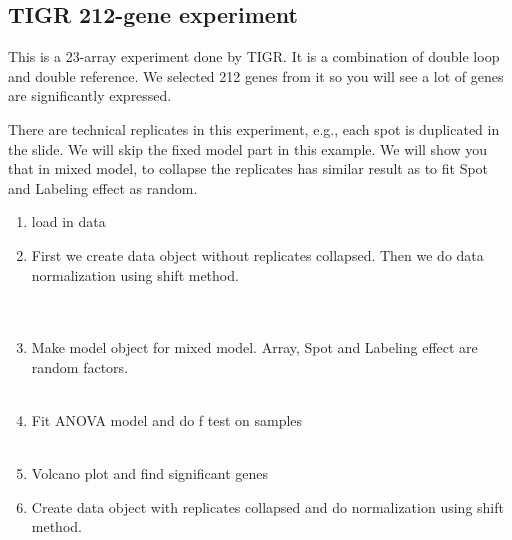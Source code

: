 \subsection{TIGR 212-gene experiment}
\hspace{14pt}This is a 23-array experiment done by TIGR. It is a combination of
double loop and double reference. We selected 212 genes from it
so you will see a lot of genes are significantly expressed. 

There are technical replicates in this experiment, e.g., each spot is duplicated
in the slide. We will skip the fixed model part in this example. We will show 
you that in mixed model, to collapse the replicates has similar result as
to fit Spot and Labeling effect as random.

\begin{enumerate}
\item load in data\\

\item First we create data object without replicates collapsed. Then
we do data normalization using shift method.\\
\\
\\

\item Make model object for mixed model. Array, Spot and Labeling effect
are random factors.\\
\\
\hspace*{50pt}

\item Fit ANOVA model and do f test on samples\\
\\

\item Volcano plot and find significant genes\\

\item Create data object with replicates collapsed
and do normalization using shift method. \\
\\
\\


\end{enumerate}
